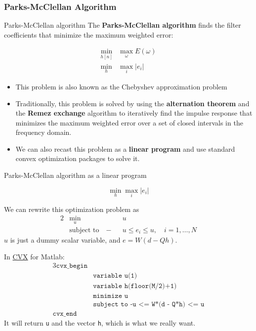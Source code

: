 \documentclass[10pt]{beamer}
\begin{document}
\subsubsection{Parks-McClellan Algorithm}
\begin{frame}{Parks-McClellan algorithm} 
The \textbf{Parks-McClellan algorithm} finds the filter coefficients that minimize the maximum weighted error:

\begin{align*}
	\min_{h[n]} &\max_\omega E(\omega) \tag{min-max problem} \\
	\min_{h} &\max_i |e_i| \tag{in matrix notation}
\end{align*}

\begin{itemize}
	\item This problem is also known as the Chebyshev approximation problem
	\item Traditionally, this problem is solved by using the \textbf{alternation theorem} and the \textbf{Remez exchange} algorithm to iteratively find the impulse response that minimizes the maximum weighted error over a set of closed intervals in the frequency domain.
	\item We can also recast this problem as a \textbf{linear program} and use standard convex optimization packages to solve it.
\end{itemize}

\end{frame}

\begin{frame}{Parks-McClellan algorithm as a linear program} 

\begin{equation*}
\min_{h}\max_i |e_i| \tag{min-max problem}
\end{equation*}

We can rewrite this optimization problem as
\vspace{-0.1cm}
\begin{alignat*}{2}
&\min_{u} &&u  \\
&\text{subject to} \quad -&&u \leq e_i \leq u, \quad i = 1, \ldots, N \tag{equivalent linear program}
\end{alignat*}
$u$ is just a dummy scalar variable, and $e = W(d - Qh)$.
\vspace{0.2cm}

In \href{http://cvxr.com/cvx/}{CVX} for Matlab:
\begin{alignat*}{3}
\texttt{cvx\_begin} \\
	&\texttt{variable u(1)} \\
	&\texttt{variable h(floor(M/2)+1)} \\
	&\texttt{minimize u}\\
	&\texttt{subject to -u <= W*(d - Q*h) <= u} \\
\texttt{cvx\_end}
\end{alignat*}
It will return \texttt{u} and the vector \texttt{h}, which is what we really want. \end{frame}
\end{document}
